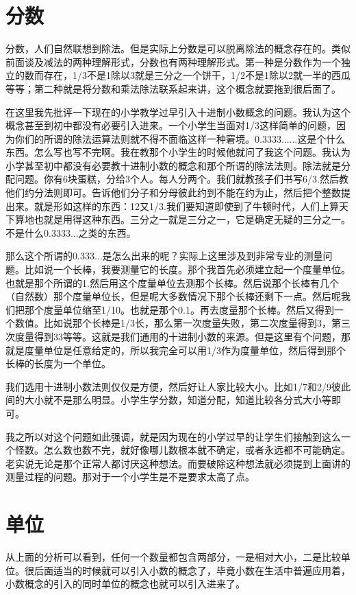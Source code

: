 \documentclass[12pt]{exam}%
\begin{document}
\section{分数}
分数，人们自然联想到除法。但是实际上分数是可以脱离除法的概念存在的。类似前面谈及减法的两种理解形式，分数也有两种理解形式。第一种是分数作为一个独立的数而存在，1/3不是1除以3就是三分之一个饼干，1/2不是1除以2就一半的西瓜等等；第二种就是将分数和乘法除法联系起来讲，这个概念就要拖到很后面了。

在这里我先批评一下现在的小学教学过早引入十进制小数概念的问题。我认为这个概念甚至到初中都没有必要引入进来。一个小学生当面对1/3这样简单的问题，因为你们的所谓的除法运算法则就不得不面临这样一种窘境。0.3333......这是个什么东西。怎么写也写不完啊。我在教那个小学生的时候他就问了我这个问题。我认为小学甚至初中都没有必要教十进制小数的概念和那个所谓的除法法则。除法就是分配问题。你有6块蛋糕，分给3个人。每人分两个。我们就教孩子们书写6/3.然后教他们约分法则即可。告诉他们分子和分母彼此约到不能在约为止，然后把个整数提出来。就是形如这样的东西：12又1/3.我们要知道即使到了牛顿时代，人们上算天下算地也就是用得这种东西。三分之一就是三分之一，它是确定无疑的三分之一。不是什么0.3333...之类的东西。

那么这个所谓的0.333...是怎么出来的呢？实际上这里涉及到非常专业的测量问题。比如说一个长棒，我要测量它的长度。那个我首先必须建立起一个度量单位。也就是那个所谓的1.然后用这个度量单位去测那个长棒。然后说那个长棒有几个（自然数）那个度量单位长，但是呢大多数情况下那个长棒还剩下一点。然后呢我们把那个度量单位缩至1/10。也就是那个0.1。再去度量那个长棒。然后又得到一个数值。比如说那个长棒是1/3长，那么第一次度量失败，第二次度量得到3，第三次度量得到33等等。这就是我们通用的十进制小数的来源。但是这里有个问题，那就是度量单位是任意给定的，所以我完全可以用1/3作为度量单位，然后得到那个长棒的长度为一个单位。

我们选用十进制小数法则仅仅是方便，然后好让人家比较大小。比如1/7和2/9彼此间的大小就不是那么明显。小学生学分数，知道分配，知道比较各分式大小等即可。

我之所以对这个问题如此强调，就是因为现在的小学过早的让学生们接触到这么一个怪数。怎么数也数不完，就好像哪儿数根本就不确定，或者永远都不可能确定。老实说无论是那个正常人都讨厌这种想法。而要破除这种想法就必须提到上面讲的测量过程的问题。那对于一个小学生是不是要求太高了点。


\section{单位}
从上面的分析可以看到，任何一个数量都包含两部分，一是相对大小，二是比较单位。很后面适当的时候就可以引入小数的概念了，毕竟小数在生活中普遍应用着，小数概念的引入的同时单位的概念也就可以引入进来了。
\end{document}
